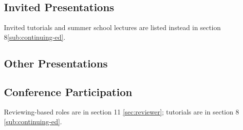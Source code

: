 \documentclass[10pt]{article}
\begin{document}
%


\subsection{Invited Presentations} %

Invited tutorials and summer school lectures are listed instead in section 8\ref{sub:continuing-ed}.
{\color{white} \international\national\local\virtual\paid}

\begin{itemize}[leftmargin=5em]

\end{itemize}


\subsection{Other Presentations}

\begin{itemize}[leftmargin=5em]

\end{itemize}


%

\subsection{Conference Participation} %
\label{sec:conference-participation}

Reviewing-based roles are in section 11 \ref{sec:reviewer}; tutorials are in section 8 \ref{sub:continuing-ed}.
\end{document}
